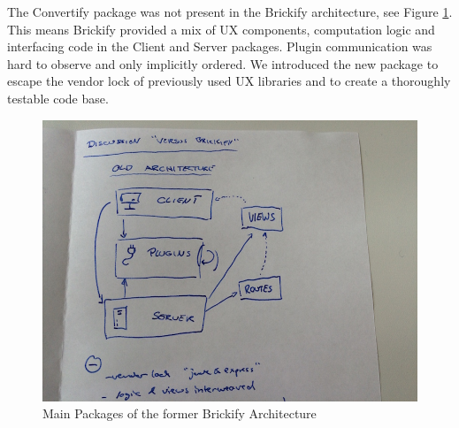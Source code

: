 \documentclass[../ClassicThesis.tex]{subfiles}
\begin{document}


The Convertify package was not present in the Brickify architecture, see Figure
\ref{fig:architecture_overview_brickify}. This means Brickify provided a mix of
UX components, computation logic and interfacing code in the Client and Server
packages. Plugin communication was hard to observe and only implicitly ordered.
We introduced the new package to escape the vendor lock of previously used UX
libraries and to create a thoroughly testable code base.

\begin{figure}
\label{fig:architecture_overview_brickify}
  \includegraphics[width=1\columnwidth]{Images/03-architecture_overview_brickify.JPG}
  \caption{Main Packages of the former Brickify Architecture}
\end{figure}
\end{document}
